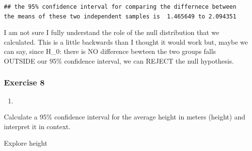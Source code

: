 \documentclass[
]{article}
\newenvironment{Shaded}{\begin{snugshade}}{\end{snugshade}}
\newcommand{\DecValTok}[1]{\textcolor[rgb]{0.00,0.00,0.81}{#1}}
\newcommand{\KeywordTok}[1]{\textcolor[rgb]{0.13,0.29,0.53}{\textbf{#1}}}
\newcommand{\NormalTok}[1]{#1}
\newcommand{\OperatorTok}[1]{\textcolor[rgb]{0.81,0.36,0.00}{\textbf{#1}}}
\newcommand{\StringTok}[1]{\textcolor[rgb]{0.31,0.60,0.02}{#1}}
\begin{document}
\begin{Shaded}
\end{Shaded}

\begin{verbatim}
## the 95% confidence interval for comparing the differnece between the means of these two independent samples is  1.465649 to 2.094351
\end{verbatim}

I am not sure I fully understand the role of the null distribution that
we calculated. This is a little backwards than I thought it would work
but, maybe we can say, since H\_0: there is NO difference bewteen the
two groups falls OUTSIDE our 95\% confidence interval, we can REJECT the
null hypothesis.

\hypertarget{exercise-8}{%
\subsubsection{Exercise 8}\label{exercise-8}}

\begin{enumerate}
\def\labelenumi{\arabic{enumi}.}
\item
\end{enumerate}

Calculate a 95\% confidence interval for the average height in meters
(height) and interpret it in context.

Explore height

\begin{Shaded}
\end{Shaded}
\end{document}
